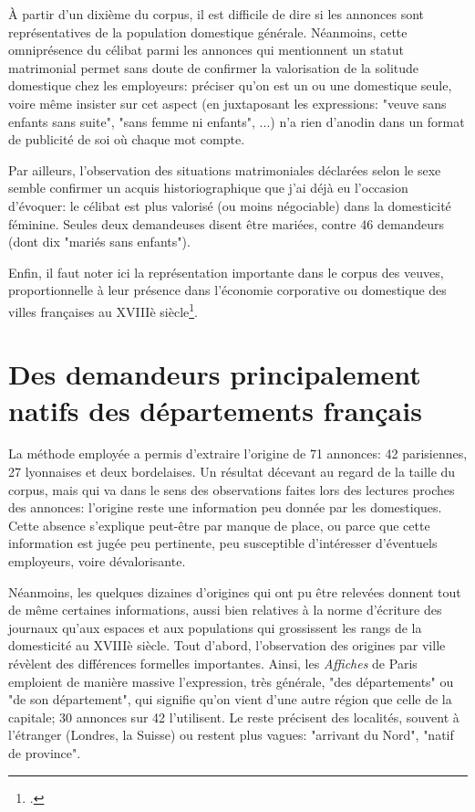 À partir d'un dixième du corpus, il est difficile de dire si les annonces sont représentatives de la population domestique générale. Néanmoins, cette omniprésence du célibat parmi les annonces qui mentionnent un statut matrimonial permet sans doute de confirmer la valorisation de la solitude domestique chez les employeurs: préciser qu'on est un ou une domestique seule, voire même insister sur cet aspect (en juxtaposant les expressions: "veuve sans enfants sans suite", "sans femme ni enfants", ...) n'a rien d'anodin dans un format de publicité de soi où chaque mot compte. 

Par ailleurs, l'observation des situations matrimoniales déclarées selon le sexe semble confirmer un acquis historiographique que j'ai déjà eu l'occasion d'évoquer: le célibat est plus valorisé (ou moins négociable) dans la domesticité féminine. Seules deux demandeuses disent être mariées, contre 46 demandeurs (dont dix "mariés sans enfants"). 

Enfin, il faut noter ici la représentation importante dans le corpus des veuves, proportionnelle à leur présence dans l'économie corporative ou domestique des villes françaises au XVIIIè siècle\footcites[p.5-18]{pellegrinVeufsVeuvesVeuvage2003}{lanzaVeuvesDansCorporations2009}.


\section{Des demandeurs principalement natifs des départements français}

La méthode employée a permis d'extraire l'origine de 71 annonces: 42 parisiennes, 27 lyonnaises et deux bordelaises. Un résultat décevant au regard de la taille du corpus, mais qui va dans le sens des observations faites lors des lectures proches des annonces: l'origine reste une information peu donnée par les domestiques. Cette absence s'explique peut-être par manque de place, ou parce que cette information est jugée peu pertinente, peu susceptible d'intéresser d'éventuels employeurs, voire dévalorisante. 

Néanmoins, les quelques dizaines d'origines qui ont pu être relevées donnent tout de même certaines informations, aussi bien relatives à la norme d'écriture des journaux qu'aux espaces et aux populations qui grossissent les rangs de la domesticité au XVIIIè siècle. Tout d'abord, l'observation des origines par ville révèlent des différences formelles importantes. Ainsi, les \textit{Affiches} de Paris emploient de manière massive l'expression, très générale, "des départements" ou "de son département", qui signifie qu'on vient d'une autre région que celle de la capitale; 30 annonces sur 42 l'utilisent. Le reste précisent des localités, souvent à l'étranger (Londres, la Suisse) ou restent plus vagues: "arrivant du Nord", "natif de province". 

